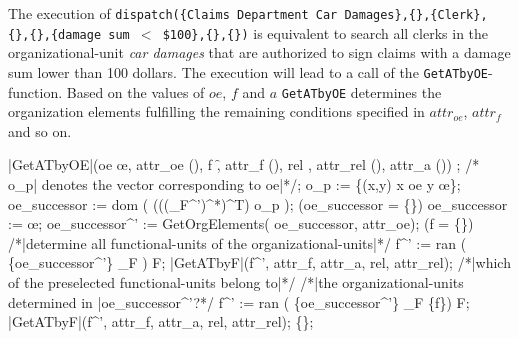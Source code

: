 \noindent The execution of {\tt dispatch(\{Claims Department Car Damages\},\{\},\{Clerk\},\\ \{\},\{\},\{damage sum $<$ \$100\},\{\},\{\})} is equivalent to search all clerks in the organizational-unit {\it car damages} that are authorized to sign claims with a damage sum lower than 100 dollars. The execution will lead to a call of the {\tt GetATbyOE}-function. Based on the values of $oe$, $f$ and $a$ {\tt GetATbyOE} determines the organization elements fulfilling the remaining conditions specified in $attr_{oe}$, $attr_{f}$ and so on.

	\begin{samepage}
	{\small
	\NumberProgramstrue
	\begin{algorithm}[GetATbyOE]\label{alg:GetATbyOE}
	\begin{program}
	\FUNCT |GetATbyOE|(oe \subset \oe, attr_{oe} \subset (\Bezeichner \times \WerteMenge), f \subset \f, 
	attr_{f} \subset (\Bezeichner \times \WerteMenge), rel \in \relname, attr_{rel} \subset (\Bezeichner \times \WerteMenge), 
	attr_a \subset (\Bezeichner \times \WerteMenge)) \subset \a
	\BEGIN
	\var {};
	/* o_{p}| denotes the vector corresponding to oe|*/; 
	o_{p} := \{(x,y) \vert x \in oe \wedge y \in \oe \};\label{alg:GetATbyOE:Vektor}
	oe_{successor} := dom \left( \left({\left({\left({\relstrukturOE_F}^{'}\right)}^{*}\right)}^{T}\right) \circ o_{p} \right);\label{alg:GetATbyOE:Nachfolger}
	\IF (oe_{successor} = \{\})
	\THEN oe_{successor} := \oe; \label{alg:GetATbyOE:kritisch2}
	\FI
	oe_{successor}^{'} := GetOrgElements( oe_{successor}, attr_{oe});
	\IF (f = \{\})\label{alg:GetATbyOE:fIstNull}
	\THEN
		/*|determine all functional-units of the organizational-units|*/
		f^{'} := ran ( \{oe_{successor}^{'}\} \lhd \relstrukturOE_F ) \cap F;
		\RETURN \quad |GetATbyF|(f^{'}, attr_{f}, attr_a, rel, attr_{rel});
	\ELSE \label{alg:GetATbyOE:fIstNichtNull}
		/*|which of the preselected functional-units belong to|*/
		/*|the organizational-units determined in |oe_{successor}^{'}?*/
		f^{'} := ran ( \{oe_{successor}^{'}\} \lhd \relstrukturOE_F \rhd \{f\}) \cap F;
		\RETURN \quad |GetATbyF|(f^{'}, attr_{f}, attr_a, rel, attr_{rel});
	\FI
	\RETURN \quad \{\};
	\END
	\end{program}
	\end{algorithm}
	\NumberProgramsfalse
	}
	\end{samepage}

